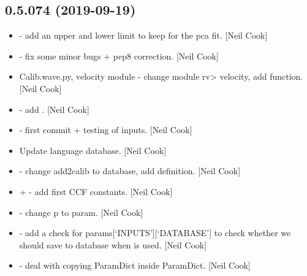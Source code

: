 \documentclass[a4paper,10pt,english]{report}
\begin{document}
\subsection{0.5.074 (2019-09-19)}
\label{\detokenize{misc/changelog:id68}}\begin{itemize}
\item {} 
 - add an upper and lower limit to keep for
the pca fit. {[}Neil Cook{]}

\item {} 
 - fix some minor bugs + pep8 correction.
{[}Neil Cook{]}

\item {} 
Calib.wave.py, velocity module - change module rv\textendash{}\textgreater{} velocity, add
 function. {[}Neil Cook{]}

\item {} 
 - add . {[}Neil Cook{]}

\item {} 
 - first commit + testing of inputs.
{[}Neil Cook{]}

\item {} 
Update language database. {[}Neil Cook{]}

\item {} 
 - change \textendash{}add2calib to
\textendash{}database, add  definition. {[}Neil Cook{]}

\item {} 
 +  - add
first CCF constants. {[}Neil Cook{]}

\item {} 
 - change p to param. {[}Neil Cook{]}

\item {} 
 - add a check for
params{[}‘INPUTS’{]}{[}‘DATABASE’{]} to check whether we should save to
database when  is used. {[}Neil Cook{]}

\item {} 
 - deal with copying ParamDict inside
ParamDict. {[}Neil Cook{]}


\end{itemize}
\end{document}
